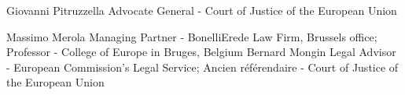 
\begin{cvskills}
\cvskill
  {Giovanni Pitruzzella} %
  {Advocate General - Court of Justice of the European Union} %

\cvskill
    {Massimo Merola} %
    {Managing Partner - BonelliErede Law Firm, Brussels office;
  Professor - College of Europe in Bruges, Belgium}  %
\cvskill
    {Bernard Mongin} %
    {Legal Advisor - European Commission’s Legal Service;
     Ancien référendaire - Court of Justice of the European Union} %

\end{cvskills}